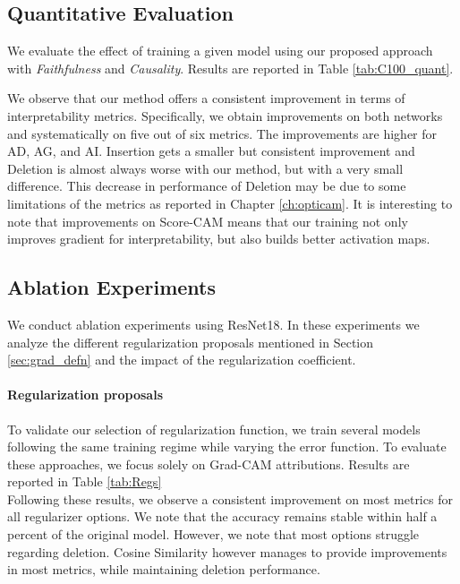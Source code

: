 \subsection{Quantitative Evaluation}
We evaluate the effect of training a given model using our proposed approach with 
\textit{Faithfulness} and \textit{Causality}. Results are reported in Table \ref{tab:C100_quant}.

\noindent We observe that our method offers a consistent improvement in terms of interpretability 
metrics. Specifically, we obtain improvements on both networks and systematically on five out of 
six metrics. The improvements are higher for AD, AG, and AI. Insertion gets a smaller but consistent 
improvement and Deletion is almost always worse with our method, but with a very small difference.
This decrease in performance of Deletion may be due to some limitations of the metrics as reported 
in Chapter \ref{ch:opticam}.
It is interesting to note that improvements on Score-CAM means that our training not only improves 
gradient for interpretability, but also builds better activation maps.\\

\subsection{Ablation Experiments}
We conduct ablation experiments using ResNet18. In these experiments we analyze the different 
regularization proposals mentioned in Section \ref{sec:grad_defn} and the impact of the 
regularization coefficient.

\paragraph{Regularization proposals} 
To validate our selection of regularization function, we train several models following the same 
training regime while varying the error function. To evaluate these approaches, we focus solely on 
Grad-CAM attributions. Results are reported in Table \ref{tab:Regs}\\

\noindent Following these results, we observe a consistent improvement on most metrics for all 
regularizer options. We note that the accuracy remains stable within half a percent of the original 
model. However, we note that most options struggle regarding deletion. Cosine Similarity however 
manages to provide improvements in most metrics, while maintaining deletion performance.

